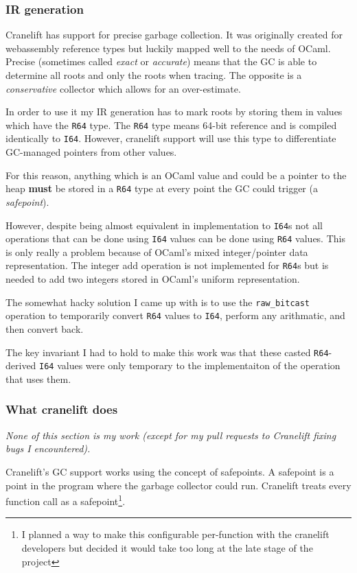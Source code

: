 \subsubsection{IR generation} \label{gc-ir}

Cranelift has support for precise garbage collection. It was originally created for webassembly
reference types but luckily mapped well to the needs of OCaml. Precise (sometimes called
\emph{exact} or \emph{accurate}) means that the GC is able to determine all roots and only the
roots
when tracing. The opposite is a \emph{conservative} collector which allows for an over-estimate.

In order to use it my IR generation has to mark roots by storing them in values which have the
\texttt{R64} type. The \texttt{R64} type means 64-bit reference and is compiled identically to
\texttt{I64}. However, cranelift support will use this type to differentiate GC-managed pointers
from other values.

For this reason, anything which is an OCaml value and could be a pointer to the heap \textbf{must}
be stored in a \texttt{R64} type at every point the GC could trigger (a \emph{safepoint}).

However, despite being almost equivalent in implementation to \texttt{I64}s not all operations that
can be done using \texttt{I64} values can be done using \texttt{R64} values. This is only really a
problem because of OCaml's mixed integer/pointer data representation. The integer add operation is
not
implemented for \texttt{R64}s but is needed to add two integers stored in OCaml's uniform
representation.

The somewhat hacky solution I came up with is to use the \texttt{raw\_bitcast} operation to
temporarily convert \texttt{R64} values to \texttt{I64}, perform any arithmatic, and then convert
back.

The key invariant I had to hold to make this work was that these casted \texttt{R64}-derived
\texttt{I64} values were only temporary to the implementaiton of the operation that uses them.

\subsubsection{What cranelift does}

\emph{None of this section is my work (except for my pull requests to Cranelift fixing bugs I
      encountered).}

Cranelift's GC support works using the concept of safepoints. A safepoint is a point in the program
where the garbage collector could run. Cranelift treats every function call as a
safepoint\footnote{I planned a way to make this configurable per-function with the cranelift
      developers but decided it would take too long at the late stage of the project}.

